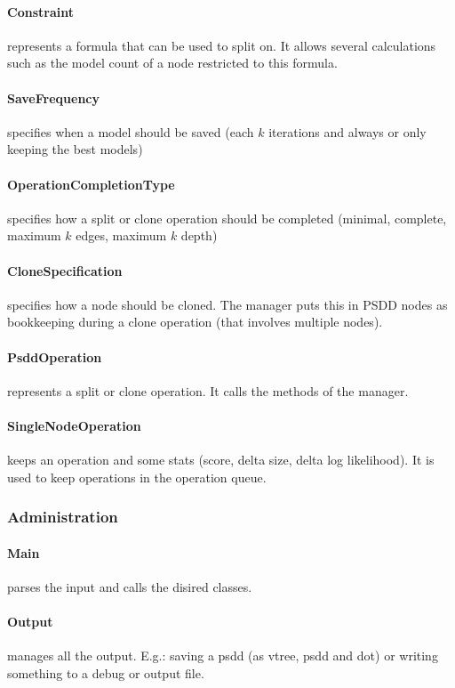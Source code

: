 \documentclass[a4paper,10pt]{article}
\begin{document}
\paragraph{Constraint} represents a formula that can be used to split on. It allows several calculations such as the model count of a node restricted to this formula.

\paragraph{SaveFrequency} specifies when a model should be saved (each $k$ iterations and always or only keeping the best models)

\paragraph{OperationCompletionType} specifies how a split or clone operation should be completed (minimal, complete, maximum $k$ edges, maximum $k$ depth)

\paragraph{CloneSpecification} specifies how a node should be cloned. The manager puts this in PSDD nodes as bookkeeping during a clone operation (that involves multiple nodes).

\paragraph{PsddOperation} represents a split or clone operation. It calls the methods of the manager.

\paragraph{SingleNodeOperation} keeps an operation and some stats (score, delta size, delta log likelihood). It is used to keep operations in the operation queue.


\subsubsection{Administration}
\paragraph{Main} parses the input and calls the disired classes.

\paragraph{Output} manages all the output. E.g.: saving a psdd (as vtree, psdd and dot) or writing something to a debug or output file.
\end{document}

